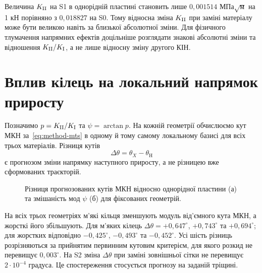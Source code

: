 Величина $K_{\mathrm{II}}$ на S1 в однорідній пластині становить лише $0{,}001514$ МПа$\sqrt{\text{м}}$ на 1 кН порівняно з $0{,}018827$ на S0. Тому відносна зміна $K_{\mathrm{II}}$ при заміні матеріалу може бути великою навіть за близької абсолютної зміни. Для фізичного тлумачення напрямних ефектів доцільніше розглядати знакові абсолютні зміни та відношення $K_{\mathrm{II}}/K_{\mathrm{I}}$, а не лише відносну зміну другого КІН.

\section{Вплив кілець на локальний напрямок приросту}
\label{sec:fixed-steering}

Позначимо $p=K_{\mathrm{II}}/K_{\mathrm{I}}$ та $\psi=\arctan p$. На кожній геометрії обчислюємо кут МКН за~\eqref{eq:method-mts} в одному й тому самому локальному базисі для всіх трьох матеріалів. Різниця кутів
\begin{equation}
 \Delta\theta=\theta_X-\theta_{\mathrm H}
 \label{eq:fixed-dtheta}
\end{equation}
є прогнозом зміни напрямку наступного приросту, а не різницею вже сформованих траєкторій.

\begin{figure}[htbp]
 \centering
 
 \caption{Різниця прогнозованих кутів МКН відносно однорідної пластини (а) та змішаність мод $\psi$ (б) для фіксованих геометрій.}
 \label{fig:fixed-direction}
\end{figure}

На всіх трьох геометріях м'які кільця зменшують модуль від'ємного кута МКН, а жорсткі його збільшують. Для м'яких кілець $\Delta\theta=+0{,}647^\circ$, $+0{,}743^\circ$ та $+0{,}694^\circ$; для жорстких відповідно $-0{,}425^\circ$, $-0{,}493^\circ$ та $-0{,}452^\circ$. Усі шість різниць розрізняються за прийнятим первинним кутовим критерієм, для якого розкид не перевищує $0{,}003^\circ$. На S2 зміна $\Delta\theta$ при заміні зовнішньої сітки не перевищує $2\cdot10^{-4}$ градуса. Це спостереження стосується прогнозу на заданій тріщині.

